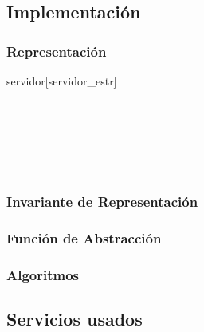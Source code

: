 \subsection{Implementación}

\subsubsection{Representación}

\begin{Estructura}{servidor}[servidor\_estr]
\begin{Tupla}
\begin{adjustwidth}{3em}{}\ \
  \\
  \\
  \\
\end{adjustwidth}\ \ \ \ \ \ \
\end{Tupla}
\end{Estructura}

\subsubsection{Invariante de Representación}

\subsubsection{Función de Abstracción}

\subsubsection{Algoritmos}

\subsection{Servicios usados}
\newpage

